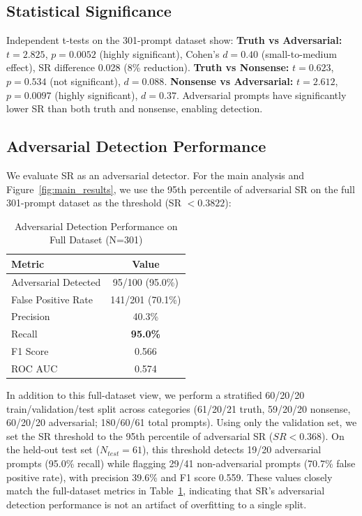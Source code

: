 \subsection{Statistical Significance}

Independent t-tests on the 301-prompt dataset show: \textbf{Truth vs Adversarial:} $t=2.825$, $p=0.0052$ (highly significant), Cohen's $d=0.40$ (small-to-medium effect), SR difference 0.028 (8\% reduction). \textbf{Truth vs Nonsense:} $t=0.623$, $p=0.534$ (not significant), $d=0.088$. \textbf{Nonsense vs Adversarial:} $t=2.612$, $p=0.0097$ (highly significant), $d=0.37$. Adversarial prompts have significantly lower SR than both truth and nonsense, enabling detection.

\subsection{Adversarial Detection Performance}

We evaluate SR as an adversarial detector. For the main analysis and Figure~\ref{fig:main_results}, we use the 95th percentile of
adversarial SR on the full 301-prompt dataset as the threshold (SR $< 0.3822$):

\begin{table}[h]
\centering
\caption{Adversarial Detection Performance on Full Dataset (N=301)}
\label{tab:detection}
\begin{tabular}{|l|c|}
\hline
\textbf{Metric} & \textbf{Value} \\
\hline
Adversarial Detected & 95/100 (95.0\%) \\
False Positive Rate & 141/201 (70.1\%) \\
Precision & 40.3\% \\
Recall & \textbf{95.0\%} \\
F1 Score & 0.566 \\
ROC AUC & 0.574 \\
\hline
\end{tabular}
\end{table}

In addition to this full-dataset view, we perform a stratified 60/20/20 train/validation/test split across categories
(61/20/21 truth, 59/20/20 nonsense, 60/20/20 adversarial; 180/60/61 total prompts). Using only the validation set, we set the
SR threshold to the 95th percentile of adversarial SR ($SR < 0.368$). On the held-out test set ($N_{test}=61$), this threshold
detects 19/20 adversarial prompts (95.0\% recall) while flagging 29/41 non-adversarial prompts (70.7\% false positive rate),
with precision 39.6\% and F1 score 0.559. These values closely match the full-dataset metrics in Table~\ref{tab:detection},
indicating that SR's adversarial detection performance is not an artifact of overfitting to a single split.

